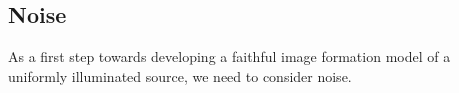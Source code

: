 


\subsection{Noise}%

As a first step towards developing a faithful image formation model of a uniformly illuminated source, we need to 
    consider noise.

